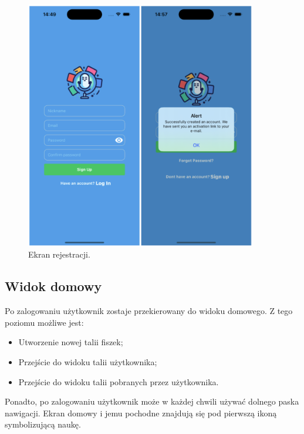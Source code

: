 \begin{figure}[H]
    \centering
    \includegraphics[width=0.9\textwidth]{chapters/chapter_10/images_mobile/mobile_register}
    \caption{Ekran rejestracji.}
    \label{img:mobile_register}
\end{figure}


\subsection{Widok domowy}
Po zalogowaniu użytkownik zostaje przekierowany do widoku domowego. Z tego poziomu możliwe jest:
\begin{itemize}
    \item Utworzenie nowej talii fiszek;
    \item Przejście do widoku talii użytkownika;
    \item Przejście do widoku talii pobranych przez użytkownika.
\end{itemize}


Ponadto, po zalogowaniu użytkownik może w każdej chwili używać dolnego paska nawigacji. Ekran domowy i jemu pochodne znajdują się pod pierwszą ikoną symbolizującą naukę.


